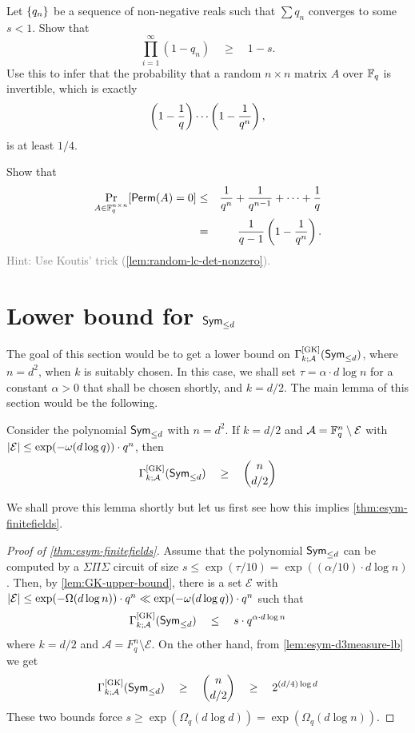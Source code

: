 \begin{exercise}
  Let $\left\{q_n\right\}$ be a sequence of non-negative reals such that $\sum q_n$ converges to some $s < 1$. 
Show that 
  \[
  \prod_{i=1}^{\infty} (1 - q_n) \quad \geq \quad 1 - s. 
  \]
  Use this to infer that the probability that a random $n\times n$ matrix $A$ over $\mathbb{F}_q$ is invertible, which is exactly
  \[
  \left(1 - \frac{1}{q}\right)\cdots \left(1 - \frac{1}{q^{n}}\right),
  \]
  is at least $1/4$. 
\end{exercise}

\begin{exercise}
  Show that
  \begin{eqnarray*}
    \Pr_{A \in \mathbb{F}_q^{n\times n}}[\operatorname{\mathsf{Perm}}(A) = 0] & \leq &  \frac{1}{q^n} + \frac{1}{q^{n-1}} + \cdots + \frac{1}{q}\\
    & = & \frac{1}{q-1}\left(1-\frac{1}{q^n}\right).
  \end{eqnarray*}
  \textcolor{gray}{Hint: Use Koutis' trick (\autoref{lem:random-lc-det-nonzero}).}
\end{exercise}

\section{Lower bound for $\operatorname{\mathsf{Sym}}_{\leq d}$}

The goal of this section would be to get a lower bound on $\Gamma^{\mathrm{[GK]}}_{k;\mathcal{A}}(\operatorname{\mathsf{Sym}}_{\leq d})$, where $n = d^2$, when $k$ is suitably chosen. In this case, we shall set $\tau = \alpha \cdot d \log n$ for a constant $\alpha>0$ that shall be chosen shortly, and $k = d/2$. The main lemma of this section would be the following. 

\begin{lemma}\label{lem:esym-d3measure-lb}
Consider the polynomial $\operatorname{\mathsf{Sym}}_{\leq d}$ with $n = d^2$. If $k = d/2$ and $\mathcal{A} = \mathbb{F}_q^n \setminus \mathcal{E}$ with $\left|\mathcal{E}\right| \leq \exp(-\omega(d\log q)) \cdot  q^n$, then
\[
\Gamma^{\mathrm{[GK]}}_{k;\mathcal{A}}(\operatorname{\mathsf{Sym}}_{\leq d}) \quad \geq \quad \binom{n}{d/2}
\]
\end{lemma}

\noindent
We shall prove this lemma shortly but let us first see how this implies \autoref{thm:esym-finitefields}. 

\begin{proof}[Proof of \autoref{thm:esym-finitefields}]
Assume that the polynomial $\operatorname{\mathsf{Sym}}_{\leq d}$ can be computed by a $\Sigma\Pi\Sigma$ circuit of size $s \leq \exp(\tau/10) = \exp((\alpha/10) \cdot d \log n)$. Then, by \autoref{lem:GK-upper-bound}, there is a set $\mathcal{E}$ with $\left|\mathcal{E}\right| \leq \exp(-\Omega(d\log n)) \cdot q^n \ll \exp(-\omega(d \log q)) \cdot q^n$ such that
\[
\Gamma^{\mathrm{[GK]}}_{k;\mathcal{A}}(\operatorname{\mathsf{Sym}}_{\leq d}) \quad \leq \quad s \cdot q^{\alpha\cdot d\log n}
\]
where $k = d/2$ and $\mathcal{A} = F_q^n \setminus \mathcal{E}$. On the other hand, from \autoref{lem:esym-d3measure-lb} we get
\[
\Gamma^{\mathrm{[GK]}}_{k;\mathcal{A}}(\operatorname{\mathsf{Sym}}_{\leq d}) \quad \geq \quad \binom{n}{d/2} \quad \geq \quad 2^{(d/4) \log d}
\]
These two bounds force $s \geq \exp(\Omega_q(d \log d)) = \exp(\Omega_q(d\log n))$. 
\end{proof}

